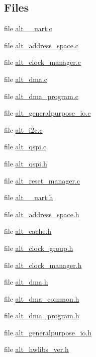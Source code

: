 \subsection*{Files}
\begin{DoxyCompactItemize}
\item 
file \mbox{\hyperlink{alt__16550__uart_8c}{alt\+\_\+\_\+uart.\+c}}
\item 
file \mbox{\hyperlink{alt__address__space_8c}{alt\+\_\+address\+\_\+space.\+c}}
\item 
file \mbox{\hyperlink{alt__clock__manager_8c}{alt\+\_\+clock\+\_\+manager.\+c}}
\item 
file \mbox{\hyperlink{alt__dma_8c}{alt\+\_\+dma.\+c}}
\item 
file \mbox{\hyperlink{alt__dma__program_8c}{alt\+\_\+dma\+\_\+program.\+c}}
\item 
file \mbox{\hyperlink{alt__generalpurpose__io_8c}{alt\+\_\+generalpurpose\+\_\+io.\+c}}
\item 
file \mbox{\hyperlink{alt__i2c_8c}{alt\+\_\+i2c.\+c}}
\item 
file \mbox{\hyperlink{alt__qspi_8c}{alt\+\_\+qspi.\+c}}
\item 
file \mbox{\hyperlink{contrib_2hwlib_2src_2hwmgr_2alt__qspi_8h}{alt\+\_\+qspi.\+h}}
\item 
file \mbox{\hyperlink{alt__reset__manager_8c}{alt\+\_\+reset\+\_\+manager.\+c}}
\item 
file \mbox{\hyperlink{alt__16550__uart_8h}{alt\+\_\+\_\+uart.\+h}}
\item 
file \mbox{\hyperlink{alt__address__space_8h}{alt\+\_\+address\+\_\+space.\+h}}
\item 
file \mbox{\hyperlink{alt__cache_8h}{alt\+\_\+cache.\+h}}
\item 
file \mbox{\hyperlink{alt__clock__group_8h}{alt\+\_\+clock\+\_\+group.\+h}}
\item 
file \mbox{\hyperlink{alt__clock__manager_8h}{alt\+\_\+clock\+\_\+manager.\+h}}
\item 
file \mbox{\hyperlink{alt__dma_8h}{alt\+\_\+dma.\+h}}
\item 
file \mbox{\hyperlink{alt__dma__common_8h}{alt\+\_\+dma\+\_\+common.\+h}}
\item 
file \mbox{\hyperlink{alt__dma__program_8h}{alt\+\_\+dma\+\_\+program.\+h}}
\item 
file \mbox{\hyperlink{alt__generalpurpose__io_8h}{alt\+\_\+generalpurpose\+\_\+io.\+h}}
\item 
file \mbox{\hyperlink{alt__hwlibs__ver_8h}{alt\+\_\+hwlibs\+\_\+ver.\+h}}

\end{DoxyCompactItemize}
